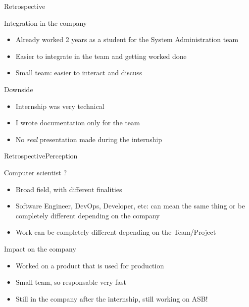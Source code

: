 \documentclass[10pt]{beamer}
\begin{document}
\begin{frame}{Retrospective}{}
\begin{block}{Integration in the company}
  \begin{itemize}
    \item Already worked 2 years as a student for the System Administration team
    \item Easier to integrate in the team and getting worked done
    \item Small team: easier to interact and discuss
  \end{itemize}
\end{block}
\begin{block}{Downside}
  \begin{itemize}
    \item Internship was very technical
    \item I wrote documentation only for the team
    \item No \textit{real} presentation made during the internship
  \end{itemize}
\end{block}
\end{frame}


\begin{frame}{Retrospective}{Perception}
\begin{block}{Computer scientist ?}
  \begin{itemize}
    \item Broad field, with different finalities
    \item Software Engineer, DevOps, Developer, etc: can mean the same thing or
    be completely different depending on the company
    \item Work can be completely different depending on the Team/Project
  \end{itemize}
\end{block}
\begin{block}{Impact on the company}
  \begin{itemize}
    \item Worked on a product that is used for production
    \item Small team, so responsable very fast
    \item Still in the company after the internship, still working on ASB!
  \end{itemize}
\end{block}
\end{frame}



%
%

{\aauwavesbg
\begin{frame}
\end{frame}}
\end{document}
